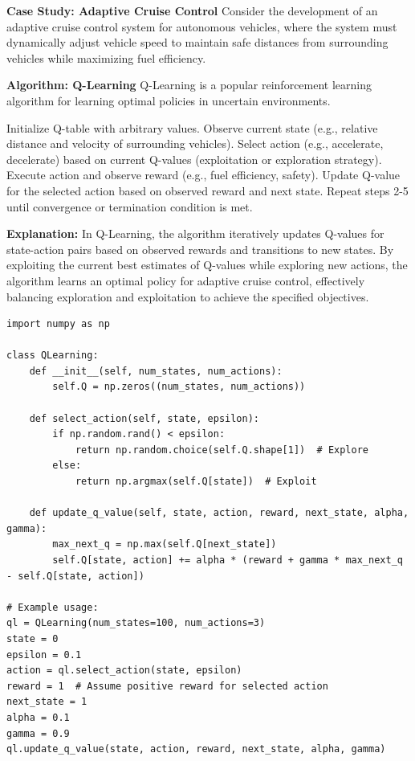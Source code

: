 \documentclass[12pt]{book} %
\begin{document}
\textbf{Case Study: Adaptive Cruise Control}
Consider the development of an adaptive cruise control system for autonomous vehicles, where the system must dynamically adjust vehicle speed to maintain safe distances from surrounding vehicles while maximizing fuel efficiency.

\textbf{Algorithm: Q-Learning}
Q-Learning is a popular reinforcement learning algorithm for learning optimal policies in uncertain environments.
\FloatBarrier
\begin{algorithm}
\caption{Q-Learning for Adaptive Cruise Control}
\begin{algorithmic}[1]
\State Initialize Q-table with arbitrary values.
\State Observe current state (e.g., relative distance and velocity of surrounding vehicles).
\State Select action (e.g., accelerate, decelerate) based on current Q-values (exploitation or exploration strategy).
\State Execute action and observe reward (e.g., fuel efficiency, safety).
\State Update Q-value for the selected action based on observed reward and next state.
\State Repeat steps 2-5 until convergence or termination condition is met.
\end{algorithmic}
\end{algorithm}
\FloatBarrier
\textbf{Explanation:}
In Q-Learning, the algorithm iteratively updates Q-values for state-action pairs based on observed rewards and transitions to new states. By exploiting the current best estimates of Q-values while exploring new actions, the algorithm learns an optimal policy for adaptive cruise control, effectively balancing exploration and exploitation to achieve the specified objectives.

\FloatBarrier
\begin{lstlisting}
import numpy as np

class QLearning:
    def __init__(self, num_states, num_actions):
        self.Q = np.zeros((num_states, num_actions))
    
    def select_action(self, state, epsilon):
        if np.random.rand() < epsilon:
            return np.random.choice(self.Q.shape[1])  # Explore
        else:
            return np.argmax(self.Q[state])  # Exploit
    
    def update_q_value(self, state, action, reward, next_state, alpha, gamma):
        max_next_q = np.max(self.Q[next_state])
        self.Q[state, action] += alpha * (reward + gamma * max_next_q - self.Q[state, action])

# Example usage:
ql = QLearning(num_states=100, num_actions=3)
state = 0
epsilon = 0.1
action = ql.select_action(state, epsilon)
reward = 1  # Assume positive reward for selected action
next_state = 1
alpha = 0.1
gamma = 0.9
ql.update_q_value(state, action, reward, next_state, alpha, gamma)
\end{lstlisting}
\end{document}
